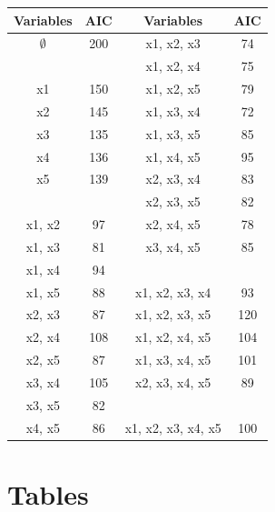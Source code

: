 \documentclass[a4paper,12pt]{article}
\begin{document}
{
	\large
	\begin{center}
		\begin{tabular}{||c|c||c|c||}
			\hline
			Variables & AIC & Variables & AIC \\ \hline \hline
			$\emptyset$	&	200	&	x1, x2, x3	&	74	\\ \hline
			\phantom{makemakespace}
			&	\phantom{makespace}
			&	x1, x2, x4	&	75	\\ \hline
			x1	&	150	&	x1, x2, x5	&	79	\\ \hline
			x2	&	145	&	x1, x3, x4	&	72	\\ \hline
			x3	&	135	&	x1, x3, x5	&	85	\\ \hline
			x4	&	136	&	x1, x4, x5	&	95	\\ \hline
			x5	&	139	&	x2, x3, x4	&	83	\\ \hline
			&		&	x2, x3, x5	&	82	\\ \hline
			x1, x2	&	97	&	x2, x4, x5	&	78	\\ \hline
			x1, x3	&	81	&	x3, x4, x5	&	85	\\ \hline
			x1, x4	&	94	&	\phantom{makemakespace}
			&	\phantom{makespace}
			\\ \hline
			x1, x5	&	88	&	x1, x2, x3, x4	&	93	\\ \hline
			x2, x3	&	87	&	x1, x2, x3, x5	&	120	\\ \hline
			x2, x4	&	108	&	x1, x2, x4, x5	&	104	\\ \hline
			x2, x5	&	87	&	x1, x3, x4, x5	&	101	\\ \hline
			x3, x4	&	105	&	x2, x3, x4, x5	&	89	\\ \hline
			x3, x5	&	82	&		&		\\ \hline
			x4, x5	&	86	&	x1, x2, x3, x4, x5	&	100	\\ \hline
		\end{tabular} 
	\end{center}
}
\newpage


\section*{Tables}
\end{document}
